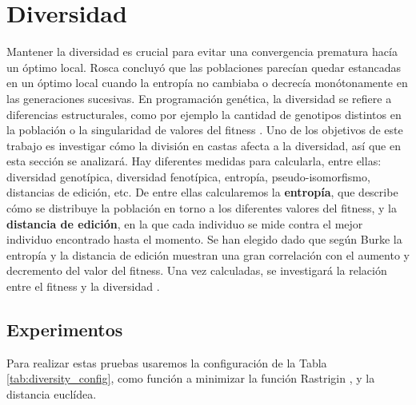 \section{Diversidad}

Mantener la diversidad es crucial para evitar una convergencia prematura hacía un óptimo local. Rosca \cite{Rosca} concluyó que las poblaciones parecían quedar estancadas
en un óptimo local cuando la entropía no cambiaba o decrecía monótonamente en las generaciones sucesivas. En programación genética, la diversidad se refiere a diferencias estructurales, 
como por ejemplo la cantidad de genotipos distintos en la población o la singularidad de valores del fitness \cite{genetic}. Uno de los objetivos de este trabajo es investigar cómo la 
división en castas afecta a la diversidad, así que en esta sección se analizará.  Hay diferentes medidas para calcularla, entre ellas: diversidad genotípica, 
diversidad fenotípica, entropía, pseudo-isomorfismo, distancias de edición, etc. De entre ellas calcularemos la \textbf{entropía}, que describe cómo se distribuye la
población en torno a los diferentes valores del fitness, y la \textbf{distancia de edición}, en la que cada individuo se mide contra el mejor individuo encontrado hasta el 
momento. Se han elegido dado que según Burke \cite{diversity} la entropía y la distancia de edición muestran una gran correlación con el aumento y decremento del valor 
del fitness. Una vez calculadas, se investigará la relación entre el fitness y la diversidad \cite{diversity}. 

\subsection{Experimentos}

Para realizar estas pruebas usaremos la configuración de la Tabla \ref{tab:diversity_config}, como función a minimizar la función Rastrigin \cite{BBOB}, y la distancia euclídea.

